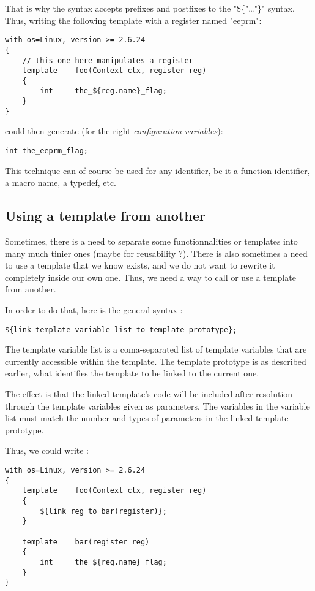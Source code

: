 \documentclass[american]{rtxreport}
\begin{document}
That is why the syntax accepts prefixes and postfixes to the "\$\{"\ldots"\}"
syntax. Thus, writing the following template with a register named "eeprm":
\begin{lstlisting}
with os=Linux, version >= 2.6.24
{
    // this one here manipulates a register
    template    foo(Context ctx, register reg)
    {
        int     the_${reg.name}_flag;
    }
}
\end{lstlisting}

could then generate (for the right \emph{configuration variables}):
\lstset{language=C}
\begin{lstlisting}
int the_eeprm_flag;
\end{lstlisting}

This technique can of course be used for any identifier, be it a function
identifier, a macro name, a typedef, etc.

\subsection{Using a template from another}

Sometimes, there is a need to separate some functionnalities or templates into
many much tinier ones (maybe for reusability ?). There is also sometimes a need
to use a template that we know exists, and we do not want to rewrite it
completely inside our own one. Thus, we need a way to call or use a template
from another.

In order to do that, here is the general syntax :
\begin{lstlisting}
${link template_variable_list to template_prototype};
\end{lstlisting}

The template variable list is a coma-separated list of template variables that
are currently accessible within the template. The template prototype is as
described earlier, what identifies the template to be linked to the current
one.

The effect is that the linked template's code will be included after resolution
through the template variables given as parameters. The variables in the
variable list must match the number and types of parameters in the linked
template prototype.

Thus, we could write : 
\begin{lstlisting}
with os=Linux, version >= 2.6.24
{
    template    foo(Context ctx, register reg)
    {
        ${link reg to bar(register)};
    }

    template    bar(register reg)
    {
        int     the_${reg.name}_flag;
    }
}
\end{lstlisting}
\end{document}
